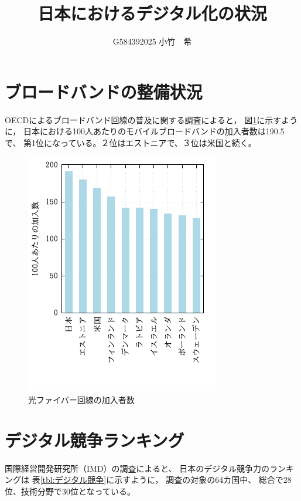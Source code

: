 \documentclass[a4paper,11pt,dvipdfmx]{ujarticle}
\title{日本におけるデジタル化の状況}
\author{G584392025 小竹　希}
\begin{document}
\maketitle %

\section{ブロードバンドの整備状況}

OECDによるブロードバンド回線の普及に関する調査\cite{OECD}によると，
図\ref{fig:加入数}に示すように，
日本における100人あたりのモバイルブロードバンドの加入者数は190.5で、
第1位になっている。２位はエストニアで、３位は米国と続く。

\begin{figure}[htbp]
    \centering
    \includegraphics[width=0.6\linewidth]{fig21.png}
    \caption{光ファイバー回線の加入者数}\label{fig:加入数}
\end{figure}

\section{デジタル競争ランキング}

国際経営開発研究所（IMD）の調査\cite{IMD}によると、
日本のデジタル競争力のランキングは
表\ref{tbl:デジタル競争}に示すように，
調査の対象の64カ国中、
総合で28位、技術分野で30位となっている。
\end{document}
